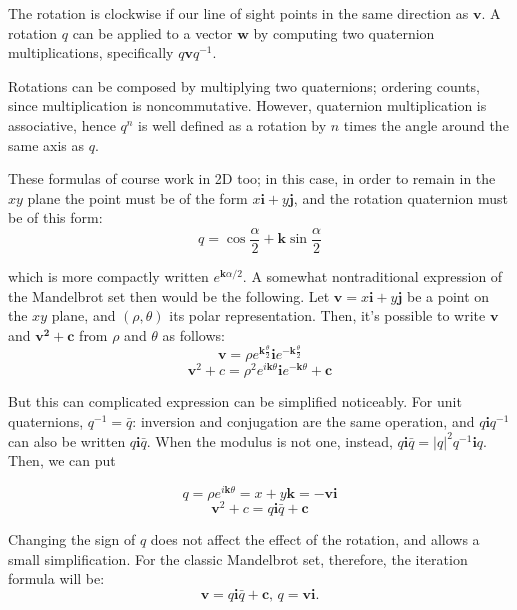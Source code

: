 \documentclass{article}
\let\vec\mathbf
\begin{document}
The rotation is clockwise if our line of sight points in the same
direction as $\vec{v}$.  A rotation $q$ can be applied to a vector
$\vec{w}$ by computing two quaternion multiplications, specifically
$q\vec{v}q^{-1}$.

Rotations can be composed by multiplying two quaternions; ordering
counts, since multiplication is noncommutative.  However, quaternion
multiplication is associative, hence $q^n$ is well defined as a rotation
by $n$ times the angle around the same axis as $q$.

These formulas of course work in 2D too; in this case, in order to remain
in the $xy$ plane the point must be of the form $x\vec{i}+y\vec{j}$,
and the rotation quaternion must be of this form:
\begin{equation*}
q = \cos \frac\alpha2 + \vec{k} \sin \frac\alpha2
\end{equation*}

\noindent
which is more compactly written $e^{\vec{k}\alpha/2}$.
A somewhat nontraditional expression of the Mandelbrot set then would
be the following.  Let $\vec{v}=x\vec{i}+y\vec{j}$ be a point on
the $xy$ plane, and $(\rho,\theta)$ its polar representation.  Then,
it's possible to write $\vec{v}$ and $\vec{v^2+c}$ from $\rho$ and $\theta$ as follows:
\begin{equation*}
\vec{v}=\rho e^{\vec{k}\frac \theta2} \vec{i} e^{-\vec{k}\frac \theta2}
\end{equation*}
\begin{equation*}
\vec{v}^2+c=\rho^2 e^{i\vec{k}\theta} \vec{i} e^{-\vec{k}\theta}+\vec{c}
\end{equation*}

But this can complicated expression can be simplified
noticeably.  For unit quaternions, $q^{-1}=\bar q$:
inversion and conjugation are the same operation, and $q\vec{i}q^{-1}$ can
also be written $q\vec{i}\bar q$.  When the modulus is not one, instead,
$q\vec{i}\bar q = |q|^2 q^{-1}\vec{i}q$.  Then, we can put

\begin{equation*}
q = \rho e^{i\vec{k}\theta} = x + y\vec{k} = -\vec{v}\vec{i}
\end{equation*}
\begin{equation*}
\vec{v}^2+c=q \vec{i} \bar q+\vec{c}
\end{equation*}

\noindent
Changing the sign of $q$ does not affect the effect of the rotation,
and allows a small simplification.  For the classic Mandelbrot set,
therefore, the iteration formula will be:
\begin{equation*}
\vec{v}=q \vec{i} \bar q+\vec{c}\text{, }q=\vec{v}\vec{i}.
\end{equation*}
\end{document}
